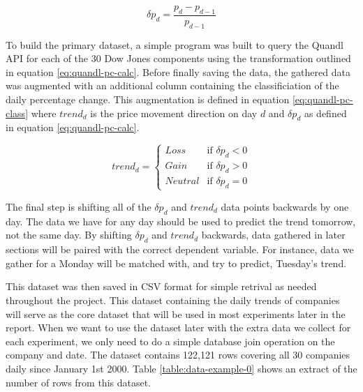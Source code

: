 \documentclass{report}
\begin{document}
\begin{figure}[H]
\begin{center}
    \begin{equation}
      \delta p_{d} = \dfrac{p_{d} - p_{d-1}} {p_{d-1}}
      \label{eq:quandl-pc-calc}
    \end{equation}
\end{center}
\end{figure}

To build the primary dataset, a simple program was built to query the Quandl API for each of the 30 Dow Jones components using the transformation outlined in equation \ref{eq:quandl-pc-calc}. Before finally saving the data, the gathered data was augmented with an additional column containing the classificiation of the daily percentage change. This augmentation is defined in equation \ref{eq:quandl-pc-class} where $trend_{d}$ is the price movement direction on day $d$ and $\delta p_{d}$ as defined in equation \ref{eq:quandl-pc-calc}.

\begin{figure}[H]
\begin{center}
\begin{equation}
trend_{d} = \begin{cases}
Loss &\text{if $\delta p_{d} < 0$}\\
Gain &\text{if $\delta p_{d} > 0$}\\
Neutral &\text{if $\delta p_{d} = 0$}
\end{cases}
\label{eq:quandl-pc-class}
\end{equation}
\end{center}
\end{figure}

The final step is shifting all of the $\delta p_{d}$ and $trend_{d}$ data points backwards by one day. The data we have for any day should be used to predict the trend tomorrow, not the same day. By shifting $\delta p_{d}$ and $trend_{d}$ backwards, data gathered in later sections will be paired with the correct dependent variable. For instance, data we gather for a Monday will be matched with, and try to predict, Tuesday's trend.

This dataset was then saved in CSV format for simple retrival as needed throughout the project. This dataset containing the daily trends of companies will serve as the core dataset that will be used in most experiments later in the report. When we want to use the dataset later with the extra data we collect for each experiment, we only need to do a simple database join operation on the company and date. The dataset contains 122,121 rows covering all 30 companies daily since January 1st 2000. Table \ref{table:data-example-0} shows an extract of the number of rows from this dataset.
\end{document}

